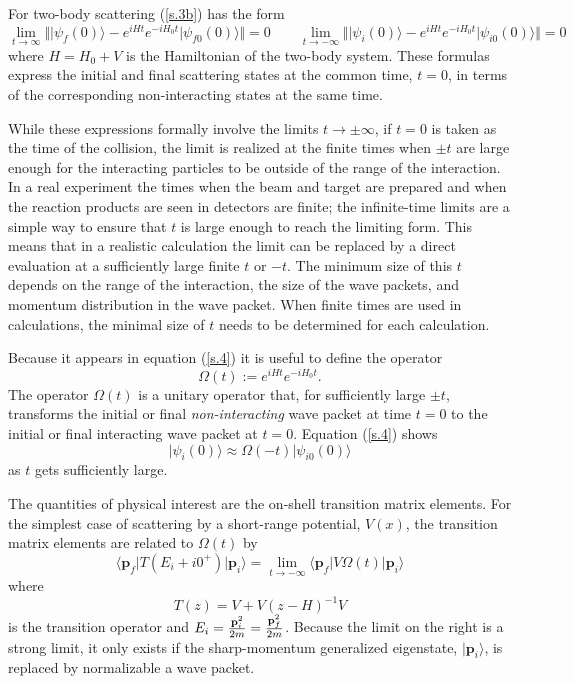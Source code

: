 \documentclass[aps,prc,reprint,noshowpacs,groupedaddress,onecolumn]{revtex4}
\def\beq{\begin{equation}}
\def\eeq{\end{equation}}
\begin{document}
For two-body scattering (\ref{s.3b})  
has the form
\beq
\lim_{t \to \infty} \Vert \vert \psi_f(0) \rangle - 
e^{iHt} e^{-iH_0t} \vert \psi_{f0}(0)
\rangle \Vert =0 
\qquad
\lim_{t \to -\infty} \Vert \vert \psi_i(0) \rangle - 
e^{iHt} e^{-iH_0t}  \vert \psi_{i0}(0)
\rangle \Vert =0 
\label{s.4}
\eeq
where $H=H_0+V$ is the Hamiltonian of the two-body system.
These formulas express the initial and final scattering states at the
common time, $t=0$, in terms of the corresponding non-interacting states at
the same time.

While these expressions formally involve the limits $t\to \pm \infty$,
if $t=0$ is taken as the time of the collision, the limit is realized
at the finite times when $\pm t$ are large enough for the interacting
particles to be outside of the range of the interaction.  In a real
experiment the times when the beam and target are prepared and when
the reaction products are seen in detectors are finite; the infinite-time
limits are a simple way to ensure that $t$ is large enough to reach
the limiting form.  This means that in a realistic calculation the
limit can be replaced by a direct evaluation at a sufficiently large
finite $t$ or $-t$.  The minimum size of this $t$ depends on the range
of the interaction, the size of the wave packets, and momentum
distribution in the wave packet.  When finite times are used in
calculations, the minimal size of $t$ needs to be determined for each
calculation.

Because it appears in equation (\ref{s.4}) it is useful to define the
operator
\beq
\Omega (t) := e^{iHt} e^{-iH_0t} .
\label{s.5}
\eeq
The operator $\Omega (t)$ is a unitary operator that, for sufficiently
large $\pm t$, transforms the initial or final {\it non-interacting} wave
packet at time $t=0$ to the initial or final interacting wave packet at
$t=0$.  Equation (\ref{s.4}) shows
\beq
\vert \psi_i(0) \rangle \approx \Omega (-t) \vert \psi_{i0}(0) \rangle 
\label{s.5b}
\eeq
as $t$ gets sufficiently large.

The quantities of physical interest are the on-shell
transition matrix elements.   For the simplest case of
scattering by a short-range potential, $V(x)$, the transition matrix elements
are related to $\Omega (t)$ by 
\beq
\langle \mathbf{p}_f \vert T(E_i+i0^+) \vert \mathbf{p}_i \rangle
=
\lim_{t \to - \infty}
\langle \mathbf{p}_f \vert V \Omega (t) \vert \mathbf{p}_i \rangle
\label{s.6}
\eeq
where
\beq
T(z) = V +V (z-H)^{-1}V
\label{s.7}
\eeq
is the transition operator and
$E_i = {\mathbf{p}_i^2 \over 2m}= {\mathbf{p}_f^2 \over 2m}$.
Because the limit on the right is a strong limit, it only exists if 
the sharp-momentum generalized eigenstate, $\vert \mathbf{p}_i \rangle$, is
replaced by normalizable a wave packet.
\end{document}
